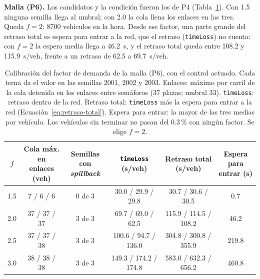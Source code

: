 \noindent\textbf{Malla (P6).} Los candidatos y la condición fueron los
de P4 (Tabla~\ref{tab:malla3-alta-factor}). Con 1.5 ninguna semilla llega al
umbral; con 2.0 la cola llena los enlaces en las tres. Queda $f = 2$:
8700 vehículos en la hora. Desde ese factor, una parte grande del
retraso total es espera para entrar a la red, que el retraso
(\texttt{timeLoss}) no cuenta: con $f = 2$ la espera media llega a
46.2~s, y el retraso total queda entre 108.2 y 115.9~s/veh, frente a un
retraso de 62.5 a 69.7~s/veh.

\begin{table}[H]
\centering
\scriptsize
\setlength{\tabcolsep}{3pt}
\begin{tabular}{cccccc}
\toprule
$f$ & \makecell{Cola máx. en\\enlaces (veh)} & \makecell{Semillas con\\\textit{spillback}} & \makecell{\texttt{timeLoss}\\(s/veh)} & \makecell{Retraso total\\(s/veh)} & \makecell{Espera para\\entrar (s)} \\
\midrule
1.5 & 7 / 6 / 6    & 0 de 3 & 30.0 / 29.9 / 29.8    & 30.7 / 30.6 / 30.5    & 0.7 \\
2.0 & 37 / 37 / 37 & 3 de 3 & 69.7 / 69.0 / 62.5    & 115.9 / 114.5 / 108.2 & 46.2 \\
2.5 & 37 / 37 / 38 & 3 de 3 & 100.6 / 94.7 / 136.0  & 304.8 / 300.8 / 355.9 & 219.8 \\
3.0 & 38 / 38 / 38 & 3 de 3 & 149.3 / 174.2 / 174.8 & 583.0 / 632.3 / 656.2 & 460.8 \\
\bottomrule
\end{tabular}
\caption[Calibración de la demanda alta de la malla (P6)]{Calibración del factor de demanda de la
malla (P6), con el control actuado. Cada terna da el valor en las semillas 2001, 2002 y 2003.
Enlaces: máximo por carril de la cola detenida en los enlaces entre semáforos (37 plazas; umbral
33). \texttt{timeLoss}: retraso dentro de la red. Retraso total: \texttt{timeLoss} más la espera
para entrar a la red (Ecuación~\ref{eq:retraso-total}). Espera para entrar: la mayor de las tres
medias por vehículo. Los vehículos sin terminar no pasan del 0.3\,\% con ningún factor. Se elige
$f = 2$.}
\label{tab:malla3-alta-factor}
\end{table}

